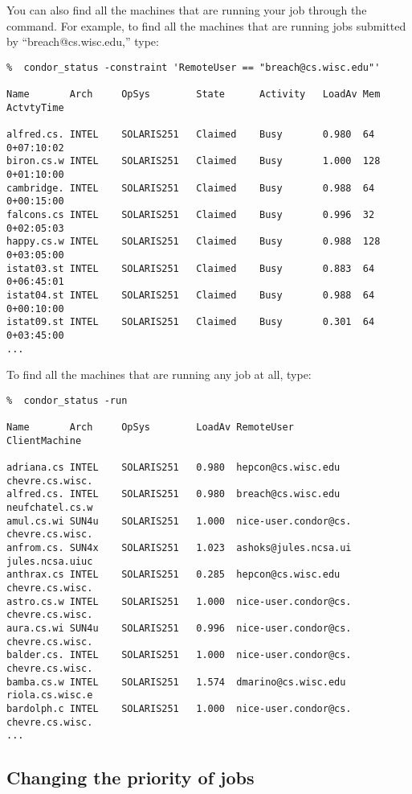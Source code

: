 You can also find all the machines that are running your job through the
 command.  For example, to find all the machines that are
running jobs submitted by ``breach@cs.wisc.edu,'' type:
\begin{verbatim}
%  condor_status -constraint 'RemoteUser == "breach@cs.wisc.edu"'

Name       Arch     OpSys        State      Activity   LoadAv Mem  ActvtyTime

alfred.cs. INTEL    SOLARIS251   Claimed    Busy       0.980  64    0+07:10:02
biron.cs.w INTEL    SOLARIS251   Claimed    Busy       1.000  128   0+01:10:00
cambridge. INTEL    SOLARIS251   Claimed    Busy       0.988  64    0+00:15:00
falcons.cs INTEL    SOLARIS251   Claimed    Busy       0.996  32    0+02:05:03
happy.cs.w INTEL    SOLARIS251   Claimed    Busy       0.988  128   0+03:05:00
istat03.st INTEL    SOLARIS251   Claimed    Busy       0.883  64    0+06:45:01
istat04.st INTEL    SOLARIS251   Claimed    Busy       0.988  64    0+00:10:00
istat09.st INTEL    SOLARIS251   Claimed    Busy       0.301  64    0+03:45:00
...
\end{verbatim}
To find all the machines that are running any job at all, type:
\begin{verbatim}
%  condor_status -run

Name       Arch     OpSys        LoadAv RemoteUser           ClientMachine  

adriana.cs INTEL    SOLARIS251   0.980  hepcon@cs.wisc.edu   chevre.cs.wisc.
alfred.cs. INTEL    SOLARIS251   0.980  breach@cs.wisc.edu   neufchatel.cs.w
amul.cs.wi SUN4u    SOLARIS251   1.000  nice-user.condor@cs. chevre.cs.wisc.
anfrom.cs. SUN4x    SOLARIS251   1.023  ashoks@jules.ncsa.ui jules.ncsa.uiuc
anthrax.cs INTEL    SOLARIS251   0.285  hepcon@cs.wisc.edu   chevre.cs.wisc.
astro.cs.w INTEL    SOLARIS251   1.000  nice-user.condor@cs. chevre.cs.wisc.
aura.cs.wi SUN4u    SOLARIS251   0.996  nice-user.condor@cs. chevre.cs.wisc.
balder.cs. INTEL    SOLARIS251   1.000  nice-user.condor@cs. chevre.cs.wisc.
bamba.cs.w INTEL    SOLARIS251   1.574  dmarino@cs.wisc.edu  riola.cs.wisc.e
bardolph.c INTEL    SOLARIS251   1.000  nice-user.condor@cs. chevre.cs.wisc.
...
\end{verbatim}

\subsection{\label{sec:job-prio}Changing the priority of jobs}

